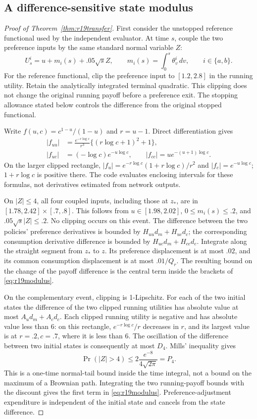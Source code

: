 \subsection{A difference-sensitive state modulus}
\begin{proof}[Proof of Theorem~\ref{thm:r19transfer}]
First consider the unstopped reference functional used by the independent evaluator. At time $s$, couple the two preference inputs by the same standard normal variable $Z$:
\[
 U_s^i=u+m_i(s)+.05\sqrt{s}Z,\qquad
 m_i(s)=\int_0^s\theta_v^i\,dv,\qquad i\in\{a,b\}.
\]
For the reference functional, clip the preference input to $[1.2,2.8]$ in the running utility. Retain the analytically integrated terminal quadratic. This clipping does not change the original running payoff before a preference exit. The stopping allowance stated below controls the difference from the original stopped functional.

Write $f(u,c)=c^{1-u}/(1-u)$ and $r=u-1$. Direct differentiation gives
\begin{align*}
 |f_{uu}|&=\frac{e^{-r\log c}}{r^3}\{(r\log c+1)^2+1\},\\
 |f_{uc}|&=(-\log c)e^{-u\log c},\qquad
 |f_{cc}|=u e^{-(u+1)\log c}.
\end{align*}
On the larger clipped rectangle, $|f_u|=e^{-r\log c}(1+r\log c)/r^2$ and $|f_c|=e^{-u\log c}$; $1+r\log c$ is positive there. The code evaluates enclosing intervals for these formulas, not derivatives estimated from network outputs.

On $|Z|\leq4$, all four coupled inputs, including those at $z_*$, are in $[1.78,2.42]\times[.7,.8]$. This follows from $u\in[1.98,2.02]$, $0\leq m_i(s)\leq .2$, and $.05\sqrt{s}|Z|\leq.2$. No clipping occurs on this event. The difference between the two policies' preference derivatives is bounded by $H_{uu}d_m+H_{uc}d_c$; the corresponding consumption derivative difference is bounded by $H_{uc}d_m+H_{cc}d_c$. Integrate along the straight segment from $z_*$ to $z$. Its preference displacement is at most $.02$, and its common consumption displacement is at most $.01/Q_r$. The resulting bound on the change of the payoff difference is the central term inside the brackets of \eqref{eq:r19modulus}.

On the complementary event, clipping is 1-Lipschitz. For each of the two initial states the difference of the two clipped running utilities has absolute value at most $A_ud_m+A_cd_c$. Each clipped running utility is negative and has absolute value less than 6: on this rectangle, $e^{-r\log c}/r$ decreases in $r$, and its largest value is at $r=.2,c=.7$, where it is less than 6. The oscillation of the difference between two initial states is consequently at most $D_4$. Mills' inequality gives
\[
 \Pr(|Z|>4)\leq 2\frac{e^{-8}}{4\sqrt{2\pi}}=P_4.
\]
This is a one-time normal-tail bound inside the time integral, not a bound on the maximum of a Brownian path. Integrating the two running-payoff bounds with the discount gives the first term in \eqref{eq:r19modulus}. Preference-adjustment expenditure is independent of the initial state and cancels from the state difference.


\end{proof}
